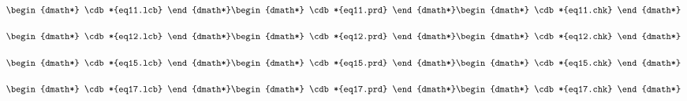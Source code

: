 \documentclass[12pt]{cdblatex}
\begin{document}
   \begin{dgroup*}
      \begin{dmath*} \cdb*{eq11.lcb} \end{dmath*}
      \begin{dmath*} \cdb*{eq11.prd} \end{dmath*}
      \begin{dmath*} \cdb*{eq11.chk} \end{dmath*}
   \end{dgroup*}


   \begin{dgroup*}
      \begin{dmath*} \cdb*{eq12.lcb} \end{dmath*}
      \begin{dmath*} \cdb*{eq12.prd} \end{dmath*}
      \begin{dmath*} \cdb*{eq12.chk} \end{dmath*}
   \end{dgroup*}


   \begin{dgroup*}
      \begin{dmath*} \cdb*{eq15.lcb} \end{dmath*}
      \begin{dmath*} \cdb*{eq15.prd} \end{dmath*}
      \begin{dmath*} \cdb*{eq15.chk} \end{dmath*}
   \end{dgroup*}


   \begin{dgroup*}
      \begin{dmath*} \cdb*{eq17.lcb} \end{dmath*}
      \begin{dmath*} \cdb*{eq17.prd} \end{dmath*}
      \begin{dmath*} \cdb*{eq17.chk} \end{dmath*}
   \end{dgroup*}

\end{document}
